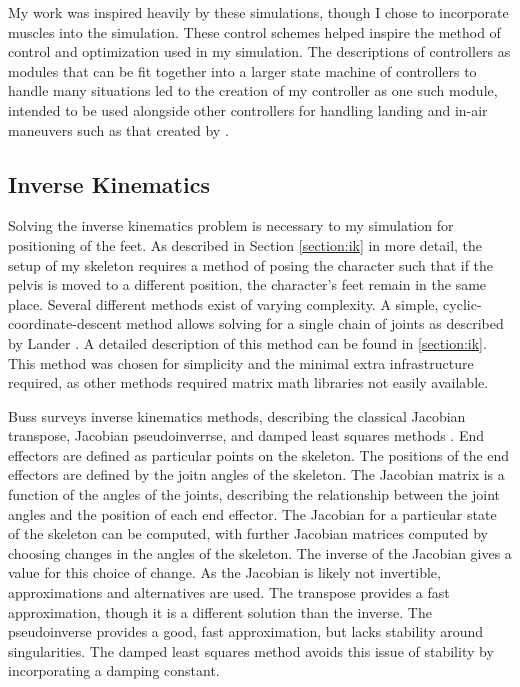 My work was inspired heavily by these simulations, though I chose to incorporate muscles into the simulation.  These control schemes helped inspire the method of control and optimization used in my simulation.  The descriptions of controllers as modules that can be fit together into a larger state machine of controllers to handle many situations led to the creation of my controller as one such module, intended to be used alongside other controllers for handling landing and in-air maneuvers such as that created by \liufall{}.

\subsection{Inverse Kinematics}
\label{subsection:ik_bg}
Solving the inverse kinematics problem is necessary to my simulation for positioning of the feet.  As described in Section \ref{section:ik} in more detail, the setup of my skeleton requires a method of posing the character such that if the pelvis is moved to a different position, the character's feet remain in the same place.  Several different methods exist of varying complexity.  A simple, cyclic-coordinate-descent method allows solving for a single chain of joints as described by Lander \cite{kine1, kine2}. A detailed description of this method can be found in \ref{section:ik}.  This method was chosen for simplicity and the minimal extra infrastructure required, as other methods required matrix math libraries not easily available.

Buss surveys inverse kinematics methods, describing the classical Jacobian transpose, Jacobian pseudoinverrse, and damped least squares methods \cite{buss_ik}.  End effectors are defined as particular points on the skeleton.  The positions of the end effectors are defined by the joitn angles of the skeleton.  The Jacobian matrix is a function of the angles of the joints, describing the relationship between the joint angles and the position of each end effector.  The Jacobian for a particular state of the skeleton can be computed, with further Jacobian matrices computed by choosing changes in the angles of the skeleton.  The inverse of the Jacobian gives a value for this choice of change.  As the Jacobian is likely not invertible, approximations and alternatives are used.  The transpose provides a fast approximation, though it is a different solution than the inverse.  The pseudoinverse provides a good, fast approximation, but lacks stability around singularities.  The damped least squares method avoids this issue of stability by incorporating a damping constant.

